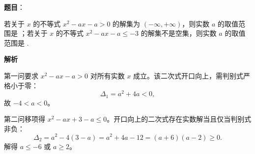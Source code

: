 \begin{answer}

\textbf{题目}：

若关于 $x$ 的不等式 $x^2-ax-a>0$ 的解集为 $(-\infty,+\infty)$，则实数 $a$ 的取值范围是 \gkblank{}；若关于 $x$ 的不等式 $x^2-ax-a\leqslant-3$ 的解集不是空集，则实数 $a$ 的取值范围是 \gkblank{}.

\textbf{解析}

第一问要求 $x^2-ax-a>0$ 对所有实数 $x$ 成立。该二次式开口向上，需判别式严格小于零：
\nopagebreak[4]
\[\Delta_1=a^2+4a<0,\]
故 $-4<a<0$。

第二问移项得 $x^2-ax+3-a\le0$。开口向上的二次式存在实数解当且仅当判别式非负：
\nopagebreak[4]
\[\Delta_2=a^2-4(3-a)=a^2+4a-12=(a+6)(a-2)\ge0.\]
解得 $a\le-6$ 或 $a\ge2$。

\gkanswer{答案：第一空 $(-4,0)$；第二空 $(-\infty,-6]\cup[2,+\infty)$}

\end{answer}

